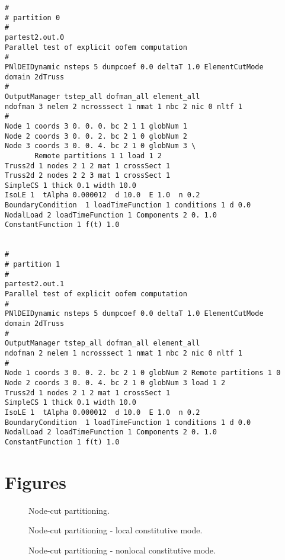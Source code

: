 \documentclass[draft]{article}
\begin{document}
\begin{verbatim}
#
# partition 0
#
partest2.out.0
Parallel test of explicit oofem computation
#
PNlDEIDynamic nsteps 5 dumpcoef 0.0 deltaT 1.0 ElementCutMode
domain 2dTruss
#
OutputManager tstep_all dofman_all element_all
ndofman 3 nelem 2 ncrosssect 1 nmat 1 nbc 2 nic 0 nltf 1
#
Node 1 coords 3 0. 0. 0. bc 2 1 1 globNum 1 
Node 2 coords 3 0. 0. 2. bc 2 1 0 globNum 2 
Node 3 coords 3 0. 0. 4. bc 2 1 0 globNum 3 \
       Remote partitions 1 1 load 1 2
Truss2d 1 nodes 2 1 2 mat 1 crossSect 1
Truss2d 2 nodes 2 2 3 mat 1 crossSect 1
SimpleCS 1 thick 0.1 width 10.0
IsoLE 1  tAlpha 0.000012  d 10.0  E 1.0  n 0.2  
BoundaryCondition  1 loadTimeFunction 1 conditions 1 d 0.0
NodalLoad 2 loadTimeFunction 1 Components 2 0. 1.0
ConstantFunction 1 f(t) 1.0


#
# partition 1
#
partest2.out.1
Parallel test of explicit oofem computation
#
PNlDEIDynamic nsteps 5 dumpcoef 0.0 deltaT 1.0 ElementCutMode
domain 2dTruss
#
OutputManager tstep_all dofman_all element_all
ndofman 2 nelem 1 ncrosssect 1 nmat 1 nbc 2 nic 0 nltf 1
#
Node 1 coords 3 0. 0. 2. bc 2 1 0 globNum 2 Remote partitions 1 0
Node 2 coords 3 0. 0. 4. bc 2 1 0 globNum 3 load 1 2 
Truss2d 1 nodes 2 1 2 mat 1 crossSect 1
SimpleCS 1 thick 0.1 width 10.0
IsoLE 1  tAlpha 0.000012  d 10.0  E 1.0  n 0.2  
BoundaryCondition  1 loadTimeFunction 1 conditions 1 d 0.0
NodalLoad 2 loadTimeFunction 1 Components 2 0. 1.0
ConstantFunction 1 f(t) 1.0
\end{verbatim}

\section{Figures}

\begin{figure}[htb]
\centerline{}
\caption{Node-cut partitioning.}
\label{nodecut}
\end{figure}

\begin{figure}[htb]
\centerline{}
\caption{Node-cut partitioning - local constitutive mode.}
\label{nodecut-lm}
\end{figure}

\begin{figure}[htb]
\centerline{}
\caption{Node-cut partitioning - nonlocal constitutive mode.}
\label{nodecut-nlm}
\end{figure}
\end{document}
